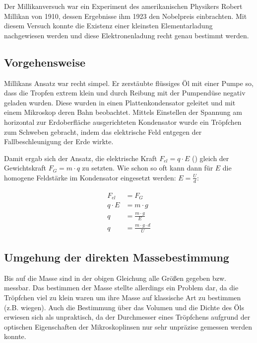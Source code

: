 Der Millikanversuch war ein Experiment des amerikanischen Physikers Robert Millikan von 1910, dessen Ergebnisse ihm 1923 den Nobelpreis einbrachten. Mit diesem Versuch konnte die Existenz einer kleinsten Elementarladung nachgewiesen werden und diese Elektronenladung recht genau bestimmt werden.

\subsection{Vorgehensweise}

Millikans Ansatz war recht simpel. Er zerstäubte flüssiges Öl mit einer Pumpe so, dass die Tropfen extrem klein und durch Reibung mit der Pumpendüse negativ geladen wurden. Diese wurden in einen Plattenkondensator geleitet und mit einem Mikroskop deren Bahn beobachtet. Mittels Einstellen der Spannung am horizontal zur Erdoberfläche ausgerichteten Kondensator wurde ein Tröpfchen zum Schweben gebracht, indem das elektrische Feld entgegen der Fallbeschleunigung der Erde wirkte.

Damit ergab sich der Ansatz, die elektrische Kraft $F_{el}=q \cdot E$ () gleich der Gewichtskraft $F_G = m \cdot q$ zu setzten. Wie schon so oft kann dann für $E$ die homogene Feldstärke im Kondensator eingesetzt werden: $E = \frac{U}{d}$:

\begin{align} \label{eq:MillikanAnsatz}
\begin{split}
	F_{el} &= F_G \\
	q \cdot E &= m \cdot g \\
	q &= \frac{m \cdot g}{E} \\
	q &= \frac{m \cdot g \cdot d}{U}
\end{split}
\end{align}


\subsection{Umgehung der direkten Massebestimmung}

Bis auf die Masse sind in der obigen Gleichung alle Größen gegeben bzw. messbar. Das bestimmen der Masse stellte allerdings ein Problem dar, da die Tröpfchen viel zu klein waren um ihre Masse auf klassische Art zu bestimmen (z.B. wiegen). Auch die Bestimmung über das Volumen und die Dichte des Öls erwiesen sich als unpraktisch, da der Durchmesser eines Tröpfchens aufgrund der optischen Eigenschaften der Mikroskoplinsen nur sehr unpräzise gemessen werden konnte.

